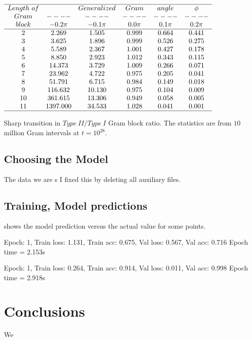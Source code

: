 \documentclass[twoside]{article}
\begin{document}
\begin{table}
\centering \(\begin{array}{cccccc}
\hline
Length~of  && Generalized &Gram&angle &\phi \\
Gram     &----&----&----&----&----\\
block  & -0.2\pi & -0.1\pi & 0.0\pi & 0.1\pi & 0.2\pi  \\
\hline
2 &2.269 &1.505 &0.999 &0.664 &0.441 \\
3 &3.625 &1.896 &0.999 &0.526 &0.275 \\
4 &5.589 &2.367 &1.001 &0.427 &0.178 \\
5 &8.850 &2.923 &1.012 &0.343 &0.115 \\
6 &14.373 &3.729 &1.009 &0.266 &0.071 \\
7 &23.962 &4.722 &0.975 &0.205 &0.041 \\
8 &51.791 &6.715 &0.984 &0.149 &0.018 \\
9 &116.632 &10.130 &0.975 &0.104 &0.009 \\
10 &361.615 &13.306 &0.949 &0.058 &0.005 \\
11 &1397.000 &34.533 &1.028 &0.041 &0.001 \\
\hline
\end{array}\)
\caption{Sharp transition in $Type~II/Type~I$ Gram block ratio.
The statistics are from $10$ million Gram intervals at $t=10^{28}$.}
\label{tab:ratioE28}
\end{table}



\subsection{\label{sec3.1} Choosing the Model}
The data we are s
I fixed this by deleting all auxiliary files.

\subsection{\label{relation}Training,  Model predictions}

shows the model prediction versus the actual value for some points.

Epoch: 1, Train loss: 1.131, Train acc: 0.675, Val loss: 0.567, Val acc: 0.716 Epoch time = 2.153s

Epoch: 1, Train loss: 0.264, Train acc: 0.914, Val loss: 0.011, Val acc: 0.998 Epoch time = 2.918s


\section{\label{conclusions}Conclusions}
We 
\end{document}

